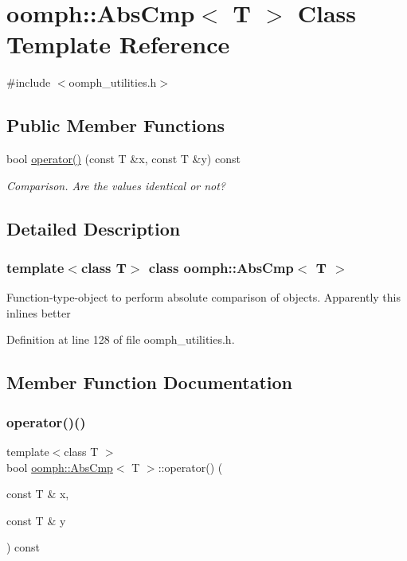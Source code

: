 \hypertarget{classoomph_1_1AbsCmp}{}\section{oomph\+:\+:Abs\+Cmp$<$ T $>$ Class Template Reference}
\label{classoomph_1_1AbsCmp}


{\ttfamily \#include $<$oomph\+\_\+utilities.\+h$>$}

\subsection*{Public Member Functions}
\begin{DoxyCompactItemize}
\item 
bool \hyperlink{classoomph_1_1AbsCmp_a6593dec1867ed74370c425cb612fb057}{operator()} (const T \&x, const T \&y) const
\begin{DoxyCompactList}\small\item\em Comparison. Are the values identical or not? \end{DoxyCompactList}\end{DoxyCompactItemize}


\subsection{Detailed Description}
\subsubsection*{template$<$class T$>$\newline
class oomph\+::\+Abs\+Cmp$<$ T $>$}

Function-\/type-\/object to perform absolute comparison of objects. Apparently this inlines better 

Definition at line 128 of file oomph\+\_\+utilities.\+h.



\subsection{Member Function Documentation}
\mbox{\label{classoomph_1_1AbsCmp_a6593dec1867ed74370c425cb612fb057}} 
\subsubsection{\texorpdfstring{operator()()}{operator()()}}
{\footnotesize\ttfamily template$<$class T $>$ \\
bool \hyperlink{classoomph_1_1AbsCmp}{oomph\+::\+Abs\+Cmp}$<$ T $>$\+::operator() (\begin{DoxyParamCaption}\item[{const T \&}]{x,  }\item[{const T \&}]{y }\end{DoxyParamCaption}) const\hspace{0.3cm}{\ttfamily [inline]}}



